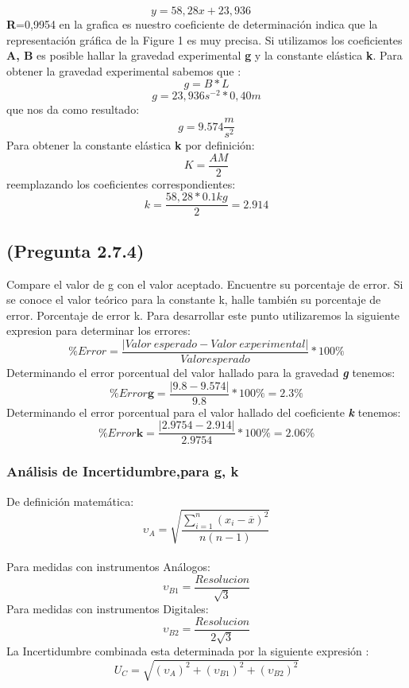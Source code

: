 \documentclass{article}
\begin{document}
\begin{equation}
 y=58,28x+23,936\quad
\end{equation}
\textbf{R}=0,9954 en la grafica es nuestro coeficiente de determinación indica que la representación gráfica de la Figure 1 es muy precisa. Si utilizamos los coeficientes \textbf{A, B} es posible hallar la gravedad experimental \textbf{g} y la constante elástica \textbf{k}.
\newline
Para obtener la gravedad experimental sabemos que :
\begin{equation}
g=B*L
\end{equation}
$$g=23,936{ s }^{ -2 }*0,40m$$
que nos da como resultado:
$$g=9.574\frac { m }{ { s }^{ 2 } } $$
Para obtener la constante elástica \textbf{k} por definición:
\begin{equation}
 K=\frac { AM }{ 2 }
\end{equation}
reemplazando los coeficientes correspondientes:
$$k =\frac { 58,28*0.1kg }{ 2 }=2.914$$


\subsection{(Pregunta 2.7.4) }
Compare el valor de g con el valor aceptado. Encuentre su porcentaje de error. Si se conoce el valor teórico para la constante k, halle también su porcentaje de error.
Porcentaje de error k.
\newline
Para desarrollar este punto utilizaremos la siguiente expresion para determinar los errores:
\begin{equation}
    \% Error = \frac{|Valor \ esperado-Valor \ experimental|}{Valor esperado}*100\%
\end{equation}
\newline
Determinando el error porcentual del valor hallado para la gravedad \textbf{\textit{g}} tenemos:
$$\% Error  \textbf{g}= \frac{|9.8-9.574|}{9.8}*100\%=2.3\% $$
\newline
Determinando el error porcentual para el valor hallado del coeficiente \textbf{\textit{k}} tenemos:
$$
    \% Error \textbf{k} = \frac{|2.9754-2.914|}{2.9754}*100\%=2.06\%    
$$

\subsubsection{Análisis de Incertidumbre,para  g, k }
De definición matemática:
\begin{equation}
  \upsilon _{A} = \sqrt{ \frac{ {\sum_{i=1}^{n} (x_{i}- \overline{x})^{2}} }{n(n-1)}  }
\end{equation}
\\
Para medidas con instrumentos Análogos:
\begin{equation}
  \upsilon _{B1} =\frac{Resolucion}{\sqrt{3}}
\end{equation}
Para medidas con instrumentos Digitales:
\begin{equation}
  \upsilon _{B2} =\frac{Resolucion}{2\sqrt{3}}
\end{equation}
La Incertidumbre combinada esta determinada por la siguiente expresión :
\begin{equation}
    U_{C} = \sqrt{(\upsilon _{A})^2+(\upsilon _{B1})^2+(\upsilon _{B2})^2}
\end{equation}
\end{document}
